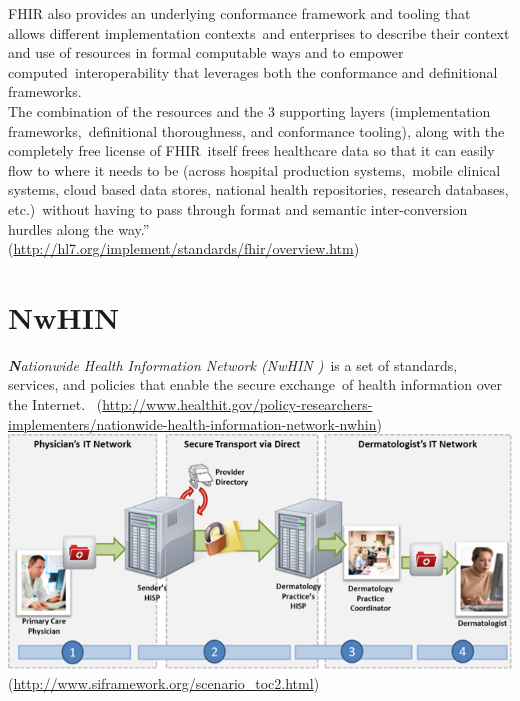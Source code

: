 \documentclass[DIV=calc, paper=a4, fontsize=12pt, onecolumn]{scrartcl}	 %
\newcommand{\initial}[1]{ %
\lettrine[lines=3,lhang=0.3,nindent=0em,slope=0em]{
\color{DarkBlue}
{\textbf{\textit{#1}}}}{}}
\begin{document}
{FHIR also provides an underlying conformance framework and tooling that allows different implementation contexts\ 
and enterprises to describe their context and use of resources in formal computable ways and to empower computed\
 interoperability that leverages both the conformance and definitional frameworks.\\

The combination of the resources and the 3 supporting layers (implementation frameworks,\
definitional thoroughness, and conformance tooling), along with the completely free license of FHIR\
 itself frees healthcare data so that it can easily flow to where it needs to be (across hospital production systems,\
 mobile clinical systems, cloud based data stores, national health repositories, research databases, etc.)\
without having to pass through format and semantic inter-conversion hurdles along the way.”\\
 (\url{http://hl7.org/implement/standards/fhir/overview.htm})



\section[Nationwide Health Information Network (NwHIN)]{NwHIN}
  \label{sec:nwhin}

\initial{N}\textit{ationwide Health Information Network (NwHIN )}\
is a set of standards, services, and policies that enable the secure exchange\
of health information over the Internet. \
(\url{http://www.healthit.gov/policy-researchers-implementers/nationwide-health-information-network-nwhin})\\

\includegraphics[scale=0.5]{nwhin.png}\\
(\url{http://www.siframework.org/scenario_toc2.html})\

}
\end{document}
